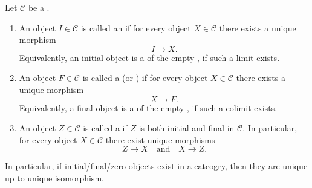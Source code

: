 \begin{definition} \label{definition:initial_final_zero_objects_of_a_category}
Let $\mathcal{C}$ be a .

\begin{enumerate}
    \item An object $I \in \mathcal{C}$ is called an  if for every object $X \in \mathcal{C}$ there exists a unique morphism
    $$I \to X.$$
    Equivalently, an initial object is a  of the empty , if such a limit exists.

    \item An object $F \in \mathcal{C}$ is called a  (or ) if for every object $X \in \mathcal{C}$ there exists a unique morphism
    $$X \to F.$$
    Equivalently, a final object is a  of the empty , if such a colimit exists.

    \item An object $Z \in \mathcal{C}$ is called a  if $Z$ is both initial and final in $\mathcal{C}$. In particular, for every object $X \in \mathcal{C}$ there exist unique morphisms
    $$Z \to X \quad \text{and} \quad X \to Z.$$
\end{enumerate}
In particular, if initial/final/zero objects exist in a cateogry, then they are unique up to unique isomorphism.
\end{definition}
